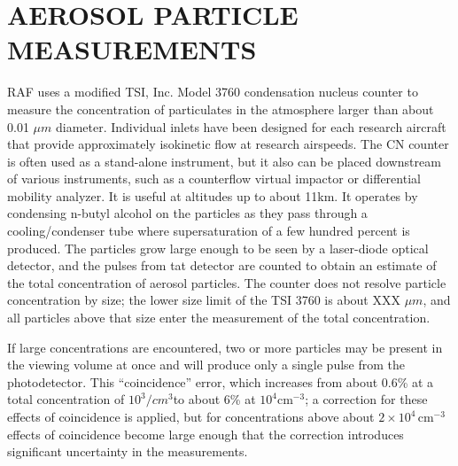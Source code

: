 
\section{AEROSOL PARTICLE MEASUREMENTS}

RAF uses a modified TSI, Inc. Model 3760 condensation nucleus counter
to measure the concentration of particulates in the atmosphere larger
than about 0.01 $\mu m$ diameter. Individual inlets have been designed
for each research aircraft that provide approximately isokinetic flow
at research airspeeds. The CN counter is often used as a stand-alone
instrument, but it also can be placed downstream of various instruments,
such as a counterflow virtual impactor or differential mobility analyzer.
It is useful at altitudes up to about 11km. It operates by condensing
n-butyl alcohol on the particles as they pass through a cooling/condenser
tube where supersaturation of a few hundred percent is produced. The
particles grow large enough to be seen by a laser-diode optical detector,
and the pulses from tat detector are counted to obtain an estimate
of the total concentration of aerosol particles. The counter does
not resolve particle concentration by size; the lower size limit of
the TSI 3760 is about XXX $\mu m$, and all particles above that size
enter the measurement of the total concentration.

If large concentrations are encountered, two or more particles may
be present in the viewing volume at once and will produce only a single
pulse from the photodetector. This ``coincidence'' error, which
increases from about 0.6\% at a total concentration of $10^{3}/cm^{3}$to
about 6\% at $10^{4}$cm$^{-3}$; a correction for these effects of
coincidence is applied, but for concentrations above about $2\times10^{4}$\,cm$^{-3}$
effects of coincidence become large enough that the correction introduces
significant uncertainty in the measurements. 

